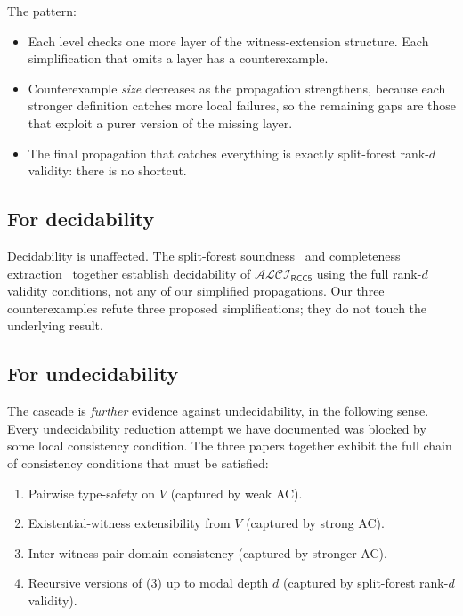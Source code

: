 \documentclass[11pt]{article}
\theoremstyle{definition}
\theoremstyle{remark}
\newcommand{\ALCIRCC}[1]{\mathcal{ALCI}_{\mathsf{RCC#1}}}
\begin{document}
The pattern:
\begin{itemize}
  \item Each level checks one more layer of the witness-extension
    structure.  Each simplification that omits a layer has a
    counterexample.
  \item Counterexample \emph{size} decreases as the propagation
    strengthens, because each stronger definition catches more local
    failures, so the remaining gaps are those that exploit a purer
    version of the missing layer.
  \item The final propagation that catches everything is exactly
    split-forest rank-$d$ validity: there is no shortcut.
\end{itemize}

\subsection{For decidability}

Decidability is unaffected.  The split-forest
soundness~\cite{SplitForest} and completeness
extraction~\cite{CompletenessExtraction} together establish
decidability of $\ALCIRCC{5}$ using the full rank-$d$ validity
conditions, not any of our simplified propagations.  Our three
counterexamples refute three proposed simplifications; they do not
touch the underlying result.

\subsection{For undecidability}

The cascade is \emph{further} evidence against undecidability, in
the following sense.  Every undecidability reduction attempt we
have documented was blocked by some local consistency condition.
The three papers together exhibit the full chain of consistency
conditions that must be satisfied:

\begin{enumerate}
  \item Pairwise type-safety on $V$ (captured by weak AC).
  \item Existential-witness extensibility from $V$ (captured by
    strong AC).
  \item Inter-witness pair-domain consistency (captured by stronger
    AC).
  \item Recursive versions of (3) up to modal depth $d$ (captured
    by split-forest rank-$d$ validity).
\end{enumerate}
\end{document}
